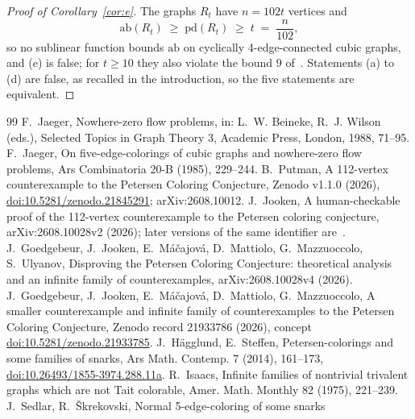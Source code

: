 \documentclass[11pt]{article}
\theoremstyle{definition}
\theoremstyle{remark}
\newcommand{\pd}{\mathrm{pd}}
\newcommand{\ab}{\mathrm{ab}}
\begin{document}
\begin{proof}[Proof of Corollary~\ref{cor:e}]
The graphs $R_t$ have $n = 102t$ vertices and
\begin{equation}\label{eq:linear}
\ab(R_t) \;\ge\; \pd(R_t) \;\ge\; t \;=\; \frac{n}{102},
\end{equation}
so no sublinear function bounds
$\ab$ on cyclically 4-edge-connected cubic graphs, and (e) is false; for $t \ge 10$ they also
violate the bound 9 of~\cite[Theorem~4]{MMM2021}. Statements (a) to (d) are false, as recalled in
the introduction, so the five statements are equivalent.
\end{proof}








\begin{thebibliography}{99}
 F.~Jaeger, Nowhere-zero flow problems, in: L.~W. Beineke, R.~J. Wilson
(eds.), Selected Topics in Graph Theory 3, Academic Press, London, 1988, 71--95.
 F.~Jaeger, On five-edge-colorings of cubic graphs and nowhere-zero flow
problems, Ars Combinatoria 20-B (1985), 229--244.
 B.~Putman, A 112-vertex counterexample to the Petersen Coloring Conjecture,
Zenodo v1.1.0 (2026), \href{https://doi.org/10.5281/zenodo.21845291}{doi:10.5281/zenodo.21845291};
arXiv:2608.10012.
 J.~Jooken, A human-checkable proof of the 112-vertex counterexample to the
Petersen coloring conjecture, arXiv:2608.10028v2 (2026); later versions of the same identifier are~\cite{GJMMMU2026}.
 J.~Goedgebeur, J.~Jooken, E.~M\'a\v{c}ajov\'a, D.~Mattiolo, G.~Mazzuoccolo,
S.~Ulyanov, Disproving the Petersen Coloring Conjecture: theoretical analysis and an infinite
family of counterexamples, arXiv:2608.10028v4 (2026).
 J.~Goedgebeur, J.~Jooken, E.~M\'a\v{c}ajov\'a, D.~Mattiolo, G.~Mazzuoccolo,
A smaller counterexample and infinite family of counterexamples to the Petersen Coloring Conjecture,
Zenodo record 21933786 (2026), concept \href{https://doi.org/10.5281/zenodo.21933785}{doi:10.5281/zenodo.21933785}.
 J.~H\"agglund, E.~Steffen, Petersen-colorings and some families of snarks, Ars
Math. Contemp. 7 (2014), 161--173, \href{https://doi.org/10.26493/1855-3974.288.11a}{doi:10.26493/1855-3974.288.11a}.
 R.~Isaacs, Infinite families of nontrivial trivalent graphs which are not Tait
colorable, Amer. Math. Monthly 82 (1975), 221--239.
 J.~Sedlar, R.~\v{S}krekovski, Normal 5-edge-coloring of some snarks

\end{thebibliography}
\end{document}
